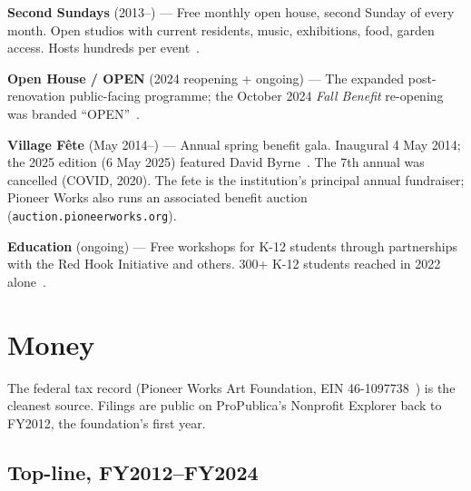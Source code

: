 \documentclass[10pt,letterpaper,twocolumn]{article}
\begin{document}
\textbf{Second Sundays} (2013--) --- Free monthly open house, second Sunday of every month. Open studios with current residents, music, exhibitions, food, garden access. Hosts hundreds per event~\citep{aaa2018pioneer}.

\textbf{Open House / OPEN} (2024 reopening + ongoing) --- The expanded post-renovation public-facing programme; the October 2024 \emph{Fall Benefit} re-opening was branded ``OPEN''~\citep{surface2024gala}.

\textbf{Village F\^ete} (May 2014--) --- Annual spring benefit gala. Inaugural 4 May 2014; the 2025 edition (6 May 2025) featured David Byrne~\citep{artnews2025fete}. The 7th annual was cancelled (COVID, 2020). The fete is the institution's principal annual fundraiser; Pioneer Works also runs an associated benefit auction (\texttt{auction.pioneerworks.org}).

\textbf{Education} (ongoing) --- Free workshops for K-12 students through partnerships with the Red Hook Initiative and others. 300+ K-12 students reached in 2022 alone~\citep{bkmag2022pioneer}.

\section{Money}\label{sec:money}

The federal tax record (Pioneer Works Art Foundation, EIN 46-1097738~\citep{propublica2026pioneer}) is the cleanest source. Filings are public on ProPublica's Nonprofit Explorer back to FY2012, the foundation's first year.

\subsection{Top-line, FY2012--FY2024}
\end{document}
